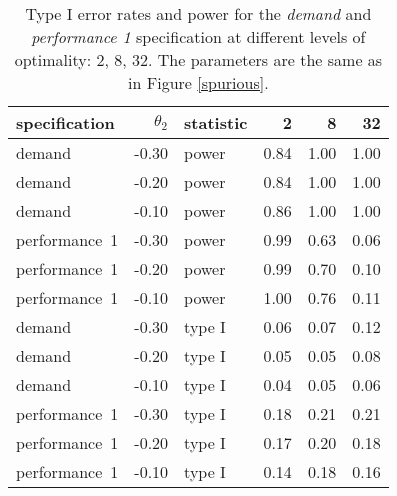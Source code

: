 \begin{table}[ht]
\centering
\begingroup\footnotesize
\begin{tabular}{lrlrrr}
  \hline
specification & $\theta_2$ & statistic & 2 & 8 & 32 \\ 
  \hline
demand & -0.30 & power & 0.84 & 1.00 & 1.00 \\ 
  demand & -0.20 & power & 0.84 & 1.00 & 1.00 \\ 
  demand & -0.10 & power & 0.86 & 1.00 & 1.00 \\ 
  performance~1 & -0.30 & power & 0.99 & 0.63 & 0.06 \\ 
  performance~1 & -0.20 & power & 0.99 & 0.70 & 0.10 \\ 
  performance~1 & -0.10 & power & 1.00 & 0.76 & 0.11 \\ 
  demand & -0.30 & type I & 0.06 & 0.07 & 0.12 \\ 
  demand & -0.20 & type I & 0.05 & 0.05 & 0.08 \\ 
  demand & -0.10 & type I & 0.04 & 0.05 & 0.06 \\ 
  performance~1 & -0.30 & type I & 0.18 & 0.21 & 0.21 \\ 
  performance~1 & -0.20 & type I & 0.17 & 0.20 & 0.18 \\ 
  performance~1 & -0.10 & type I & 0.14 & 0.18 & 0.16 \\ 
   \hline
\end{tabular}
\endgroup
\caption{Type I error rates and power for the \emph{demand} and
             \emph{performance 1} specification at different levels of 
             optimality: 2, 8, 32. The parameters are the same as in Figure 
             \ref{spurious}.} 
\label{spurious-table}
\end{table}
